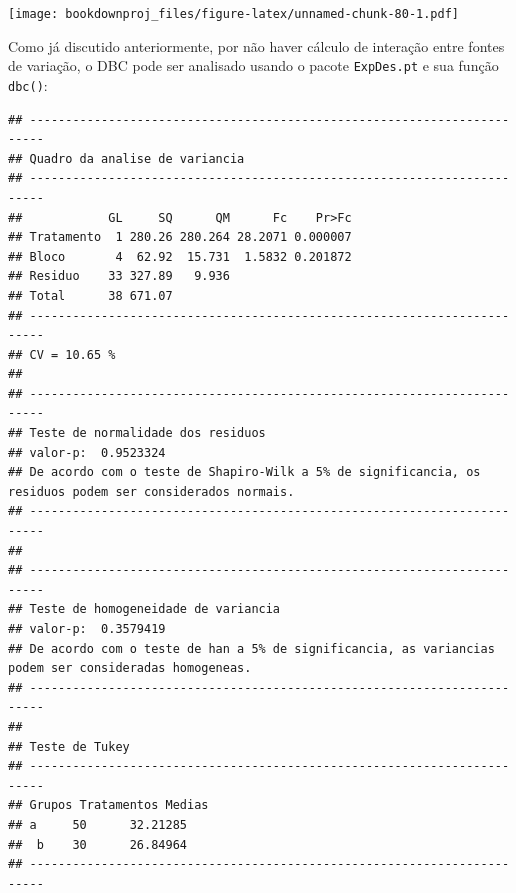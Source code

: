 \documentclass[
]{article}
\newenvironment{Shaded}{\begin{snugshade}}{\end{snugshade}}
\newcommand{\DataTypeTok}[1]{\textcolor[rgb]{0.13,0.29,0.53}{#1}}
\newcommand{\DecValTok}[1]{\textcolor[rgb]{0.00,0.00,0.81}{#1}}
\newcommand{\KeywordTok}[1]{\textcolor[rgb]{0.13,0.29,0.53}{\textbf{#1}}}
\newcommand{\NormalTok}[1]{#1}
\newcommand{\OperatorTok}[1]{\textcolor[rgb]{0.81,0.36,0.00}{\textbf{#1}}}
\newcommand{\StringTok}[1]{\textcolor[rgb]{0.31,0.60,0.02}{#1}}
\begin{document}
\begin{Shaded}
\end{Shaded}

\texttt{[image: bookdownproj\_files/figure-latex/unnamed-chunk-80-1.pdf]}

Como já discutido anteriormente, por não haver cálculo de interação entre fontes de variação, o DBC pode ser analisado usando o pacote \texttt{ExpDes.pt} e sua função \texttt{dbc()}:

\begin{Shaded}
\end{Shaded}

\begin{verbatim}
## ------------------------------------------------------------------------
## Quadro da analise de variancia
## ------------------------------------------------------------------------
##            GL     SQ      QM      Fc    Pr>Fc
## Tratamento  1 280.26 280.264 28.2071 0.000007
## Bloco       4  62.92  15.731  1.5832 0.201872
## Residuo    33 327.89   9.936                 
## Total      38 671.07                         
## ------------------------------------------------------------------------
## CV = 10.65 %
## 
## ------------------------------------------------------------------------
## Teste de normalidade dos residuos 
## valor-p:  0.9523324 
## De acordo com o teste de Shapiro-Wilk a 5% de significancia, os residuos podem ser considerados normais.
## ------------------------------------------------------------------------
## 
## ------------------------------------------------------------------------
## Teste de homogeneidade de variancia 
## valor-p:  0.3579419 
## De acordo com o teste de han a 5% de significancia, as variancias podem ser consideradas homogeneas.
## ------------------------------------------------------------------------
## 
## Teste de Tukey
## ------------------------------------------------------------------------
## Grupos Tratamentos Medias
## a     50      32.21285 
##  b    30      26.84964 
## ------------------------------------------------------------------------
\end{verbatim}
\end{document}
